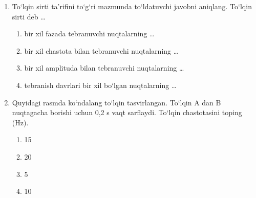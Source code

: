 \begin{enumerate}
\item To‘lqin sirti ta’rifini to‘g‘ri mazmunda to‘ldatuvchi javobni aniqlang. To‘lqin sirti deb …
\begin{enumerate}[label=\Alph*)]
\item bir xil fazada tebranuvchi nuqtalarning …
\item bir xil chastota bilan tebranuvchi nuqtalarning …
\item bir xil amplituda bilan tebranuvchi nuqtalarning …
\item tebranish davrlari bir xil bo‘lgan nuqtalarning …
\end{enumerate}

\item Quyidagi rasmda ko‘ndalang to‘lqin tasvirlangan. To‘lqin A dan B nuqtagacha borishi uchun 0,2 s vaqt sarflaydi. To‘lqin chastotasini toping (Hz).


\begin{enumerate}[label=\Alph*)]
\item 15
\item 20
\item 5
\item 10
\end{enumerate}


\end{enumerate}
